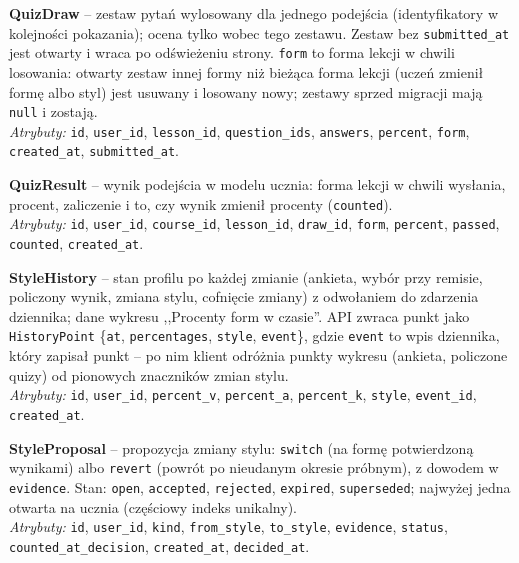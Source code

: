 \vspace{0.5em}
\textbf{QuizDraw} -- zestaw pytań wylosowany dla jednego podejścia (identyfikatory w kolejności pokazania); ocena tylko wobec tego zestawu. Zestaw bez \texttt{submitted\_at} jest otwarty i wraca po odświeżeniu strony. \texttt{form} to forma lekcji w chwili losowania: otwarty zestaw innej formy niż bieżąca forma lekcji (uczeń zmienił formę albo styl) jest usuwany i losowany nowy; zestawy sprzed migracji mają \texttt{null} i zostają. \\
\textit{Atrybuty:} \texttt{id}, \texttt{user\_id}, \texttt{lesson\_id}, \texttt{question\_ids}, \texttt{answers}, \texttt{percent}, \texttt{form}, \texttt{created\_at}, \texttt{submitted\_at}.

\vspace{0.5em}
\textbf{QuizResult} -- wynik podejścia w modelu ucznia: forma lekcji w chwili wysłania, procent, zaliczenie i to, czy wynik zmienił procenty (\texttt{counted}). \\
\textit{Atrybuty:} \texttt{id}, \texttt{user\_id}, \texttt{course\_id}, \texttt{lesson\_id}, \texttt{draw\_id}, \texttt{form}, \texttt{percent}, \texttt{passed}, \texttt{counted}, \texttt{created\_at}.

\vspace{0.5em}
\textbf{StyleHistory} -- stan profilu po każdej zmianie (ankieta, wybór przy remisie, policzony wynik, zmiana stylu, cofnięcie zmiany) z odwołaniem do zdarzenia dziennika; dane wykresu ,,Procenty form w czasie''. API zwraca punkt jako \texttt{HistoryPoint} \{\texttt{at}, \texttt{percentages}, \texttt{style}, \texttt{event}\}, gdzie \texttt{event} to wpis dziennika, który zapisał punkt -- po nim klient odróżnia punkty wykresu (ankieta, policzone quizy) od pionowych znaczników zmian stylu. \\
\textit{Atrybuty:} \texttt{id}, \texttt{user\_id}, \texttt{percent\_v}, \texttt{percent\_a}, \texttt{percent\_k}, \texttt{style}, \texttt{event\_id}, \texttt{created\_at}.

\vspace{0.5em}
\textbf{StyleProposal} -- propozycja zmiany stylu: \texttt{switch} (na formę potwierdzoną wynikami) albo \texttt{revert} (powrót po nieudanym okresie próbnym), z dowodem w \texttt{evidence}. Stan: \texttt{open}, \texttt{accepted}, \texttt{rejected}, \texttt{expired}, \texttt{superseded}; najwyżej jedna otwarta na ucznia (częściowy indeks unikalny). \\
\textit{Atrybuty:} \texttt{id}, \texttt{user\_id}, \texttt{kind}, \texttt{from\_style}, \texttt{to\_style}, \texttt{evidence}, \texttt{status}, \texttt{counted\_at\_decision}, \texttt{created\_at}, \texttt{decided\_at}.

